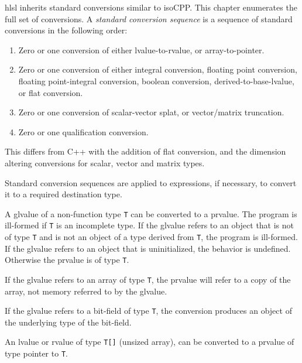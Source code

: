 
\p \acrshort{hlsl} inherits standard conversions similar to \gls{isoCPP}. This
chapter enumerates the full set of conversions. A \textit{standard conversion
sequence} is a sequence of standard conversions in the following order:
\begin{enumerate}
  \item Zero or one conversion of either lvalue-to-rvalue, or array-to-pointer.
  \item Zero or one conversion of either integral conversion, floating point
  conversion, floating point-integral conversion, boolean conversion,
  derived-to-base-lvalue, or flat conversion.
  \item Zero or one conversion of scalar-vector splat, or vector/matrix
  truncation.
  \item Zero or one qualification conversion.
\end{enumerate}

\begin{note}
  This differs from C++ with the addition of flat conversion, and the dimension
  altering conversions for scalar, vector and matrix types.
\end{note}

Standard conversion sequences are applied to expressions, if necessary, to
convert it to a required destination type.


\p A glvalue of a non-function type \texttt{T} can be converted to a prvalue.
The program is ill-formed if \texttt{T} is an incomplete type. If the glvalue
refers to an object that is not of type \texttt{T} and is not an object of a
type derived from \texttt{T}, the program is ill-formed. If the glvalue refers
to an object that is uninitialized, the behavior is undefined. Otherwise the
prvalue is of type \texttt{T}.

\p If the glvalue refers to an array of type \texttt{T}, the prvalue will refer
to a copy of the array, not memory referred to by the glvalue.

\p If the glvalue refers to a bit-field of type \texttt{T}, the conversion
produces an object of the underlying type of the bit-field.


\p An lvalue or rvalue of type \texttt{T[]} (unsized array), can be converted to
a prvalue of type pointer to \texttt{T}.

